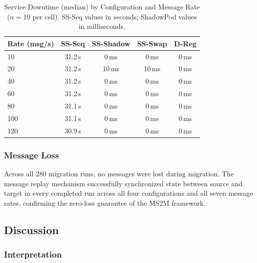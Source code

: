 \documentclass[conference]{IEEEtran}
\begin{document}

\begin{table}[t]
\centering
\caption{Service Downtime (median) by Configuration and Message Rate ($n=10$
per cell). SS-Seq values in seconds; ShadowPod values in milliseconds.}
\label{tab:downtime}
\begin{tabular}{lcccc}
\toprule
\textbf{Rate (msg/s)} & \textbf{SS-Seq} & \textbf{SS-Shadow} & \textbf{SS-Swap} & \textbf{D-Reg} \\
\midrule
10  & 31.2\,s & 0\,ms & 0\,ms & 0\,ms \\
20  & 31.2\,s & 10\,ms & 10\,ms & 0\,ms \\
40  & 31.2\,s & 0\,ms & 0\,ms & 0\,ms \\
60  & 31.2\,s & 0\,ms & 0\,ms & 0\,ms \\
80  & 31.1\,s & 0\,ms & 0\,ms & 0\,ms \\
100 & 31.1\,s & 0\,ms & 0\,ms & 0\,ms \\
120 & 30.9\,s & 0\,ms & 0\,ms & 0\,ms \\
\bottomrule
\end{tabular}
\end{table}

\subsubsection{Message Loss}

Across all 280 migration runs, no messages were lost during migration. The
message replay mechanism successfully synchronized state between source and
target in every completed run across all four configurations and all seven
message rates, confirming the zero-loss guarantee of the MS2M framework.


\subsection{Discussion}
\label{sec:discussion}

\subsubsection{Interpretation}

\end{document}

